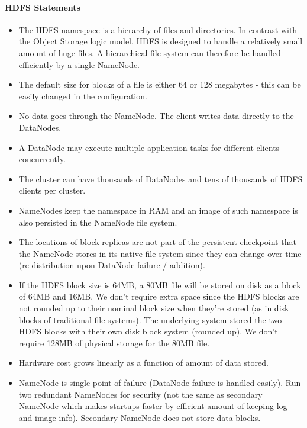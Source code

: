 \paragraph{HDFS Statements}
\begin{itemize}
    \item The HDFS namespace is a hierarchy of files and directories. In contrast with the Object Storage logic model, HDFS is designed to handle a relatively small amount of huge files. A hierarchical file system can therefore be handled efficiently by a single NameNode.
    \item The default size for blocks of a file is either 64 or 128 megabytes - this can be easily changed in the configuration.
    \item No data goes through the NameNode. The client writes data directly to the DataNodes. %
    \item A DataNode may execute multiple application tasks for different clients concurrently.
    \item The cluster can have thousands of DataNodes and tens of thousands of HDFS clients per cluster.
    \item NameNodes keep the namespace in RAM and an image of such namespace is also persisted in the NameNode file system.
    \item The locations of block replicas are not part of the persistent checkpoint that the NameNode stores in its native file system since they can change over time (re-distribution upon DataNode failure / addition).
    \item If the HDFS block size is 64MB, a 80MB file will be stored on disk as a block of 64MB and 16MB. We don't require extra space since the HDFS blocks are not rounded up to their nominal block size when they're stored (as in disk blocks of traditional file systems). The underlying system stored the two HDFS blocks with their own disk block system (rounded up). We don't require 128MB of physical storage for the 80MB file.
    \item Hardware cost grows linearly as a function of amount of data stored.
    \item NameNode is single point of failure (DataNode failure is handled easily). Run two redundant NameNodes for security (not the same as secondary NameNode which makes startups faster by efficient amount of keeping log and image info). Secondary NameNode does not store data blocks.
\end{itemize}

